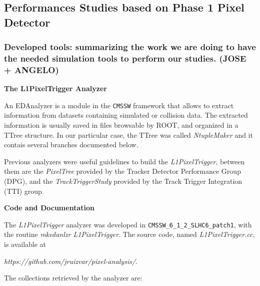 \subsection{Performances Studies based on Phase 1 Pixel Detector}

\subsubsection{Developed tools: summarizing the work we are doing to have the needed simulation tools to perform our studies. (JOSE + ANGELO)}

\vspace{0.5 cm}
\textbf{The L1PixelTrigger Analyzer}

An EDAnalyzer is a module in the \texttt{CMSSW} framework that allows to extract information from datasets
containing simulated or collision data. The extracted information is usually saved in files browsable by ROOT,
and organized in a TTree structure. In our particular case, the TTree was called \textit{NtupleMaker} and it
contais several branches documented below.

Previous analyzers were useful guidelines to build the \textit{L1PixelTrigger}, between them are the
\textit{PixelTree} provided by the Tracker Detector Performance Group (DPG), and the \textit{TrackTriggerStudy}
provided by the Track Trigger Integration (TTI) group.

\vspace{0.5 cm}
\textbf{Code and Documentation}

The \textit{L1PixelTrigger} analyzer was developed in \texttt{CMSSW\_6\_1\_2\_SLHC6\_patch1}, with the routine
{\it mkedanlzr L1PixelTrigger}. The source code, named {\it L1PixelTrigger.cc}, is available at

{\it https://github.com/jruizvar/pixel-analysis/}. 

The collections retrieved by the analyzer are:

